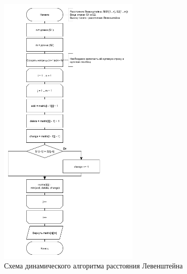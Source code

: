 \begin{figure}[h]
    \centering
    \includegraphics[width=0.6\textwidth]{images/lev_dyn.jpg}
    \caption{Схема динамического алгоритма расстояния Левенштейна}
    \label{fig:images-dyn-lev}
\end{figure}
